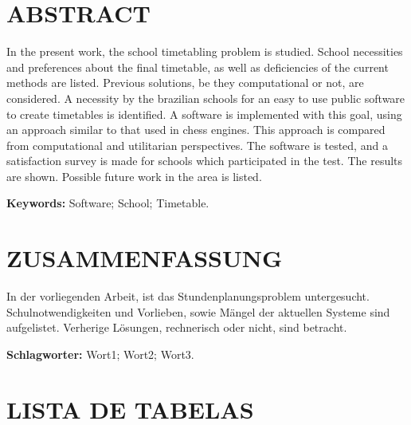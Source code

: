 \documentclass[12pt,a4paper]{article}
\begin{document}
	\thispagestyle{empty}
	\section*{ABSTRACT}

	In the present work, the school timetabling problem is studied. School necessities and preferences about the final timetable, as well as deficiencies of the current methods are listed. Previous solutions, be they computational or not, are considered. A necessity by the brazilian schools for an easy to use public software to create timetables is identified. A software is implemented with this goal, using an approach similar to that used in chess engines. This approach is compared from computational and utilitarian perspectives. The software is tested, and a satisfaction survey is made for schools which participated in the test. The results are shown. Possible future work in the area is listed.

	\begingroup
		\setlength{\parindent}{0mm}
		\textbf{Keywords:} Software; School; Timetable.
	\endgroup

	\newpage


	\thispagestyle{empty}
	\section*{ZUSAMMENFASSUNG}

	In der vorliegenden Arbeit, ist das Stundenplanungsproblem untergesucht. Schulnotwendigkeiten und Vorlieben, sowie Mängel der aktuellen Systeme sind aufgelistet. Verherige Lösungen, rechnerisch oder nicht, sind betracht.

	\lipsum[1]


	\begingroup
		\setlength{\parindent}{0mm}
		\textbf{Schlagworter:} Wort1; Wort2; Wort3.
	\endgroup

	\newpage

	\thispagestyle{empty}
	\section*{LISTA DE TABELAS}

	\listoftables

	\newpage
\end{document}
